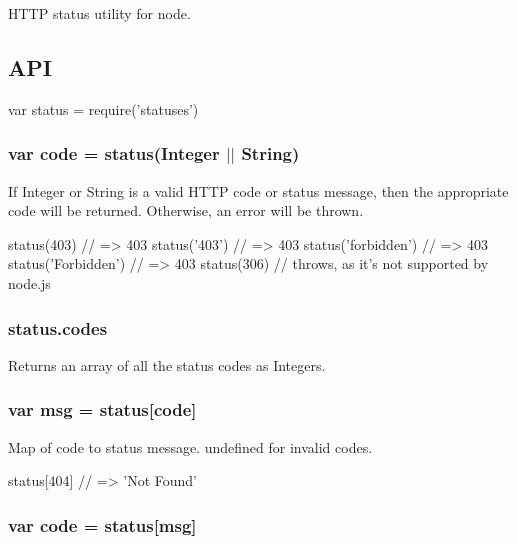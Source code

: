 \href{https://npmjs.org/package/statuses}{\tt } \href{https://npmjs.org/package/statuses}{\tt } \href{https://nodejs.org/en/download}{\tt } \href{https://travis-ci.org/jshttp/statuses}{\tt } \href{https://coveralls.io/r/jshttp/statuses?branch=master}{\tt }

H\+T\+TP status utility for node.

\subsection*{A\+PI}


\begin{DoxyCode}
var status = require('statuses')
\end{DoxyCode}


\subsubsection*{var code = status(Integer $\vert$$\vert$ String)}

If {\ttfamily Integer} or {\ttfamily String} is a valid H\+T\+TP code or status message, then the appropriate {\ttfamily code} will be returned. Otherwise, an error will be thrown.


\begin{DoxyCode}
status(403) // => 403
status('403') // => 403
status('forbidden') // => 403
status('Forbidden') // => 403
status(306) // throws, as it's not supported by node.js
\end{DoxyCode}


\subsubsection*{status.\+codes}

Returns an array of all the status codes as {\ttfamily Integer}s.

\subsubsection*{var msg = status\mbox{[}code\mbox{]}}

Map of {\ttfamily code} to {\ttfamily status message}. {\ttfamily undefined} for invalid {\ttfamily code}s.


\begin{DoxyCode}
status[404] // => 'Not Found'
\end{DoxyCode}


\subsubsection*{var code = status\mbox{[}msg\mbox{]}}


